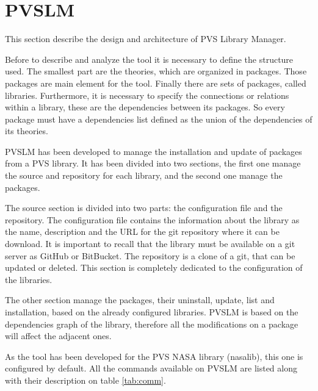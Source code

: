 \section{PVSLM}
\label{sec:pvslm}

This section describe the design and architecture of PVS Library Manager.

Before to describe and analyze the tool it is necessary to define the structure used. The smallest part are the theories, which are organized in packages. Those packages are main element for the tool. Finally there are sets of packages, called libraries. Furthermore, it is necessary to specify the connections or relations within a library, these are the dependencies between its packages. So every package must have a dependencies list defined as the union of the dependencies of its theories.

PVSLM has been developed to manage the installation and update of packages from a PVS library. It has been divided into two sections, the first one manage the source and repository for each library, and the second one manage the packages.

The source section is divided into two parts: the configuration file and the repository. The configuration file contains the information about the library as the name, description and the URL for the git repository where it can be download. It is important to recall that the library must be available on a git server as GitHub or BitBucket. The repository is a clone of a git, that can be updated or deleted. This section is completely dedicated to the configuration of the libraries.

The other section manage the packages, their uninstall, update, list and installation, based on the already configured libraries. PVSLM is based on the dependencies graph of the library, therefore all the modifications on a package will affect the adjacent ones.

As the tool has been developed for the PVS NASA library (nasalib), this one is configured by default. All the commands available on PVSLM are listed along with their description on table \ref{tab:comm}.

